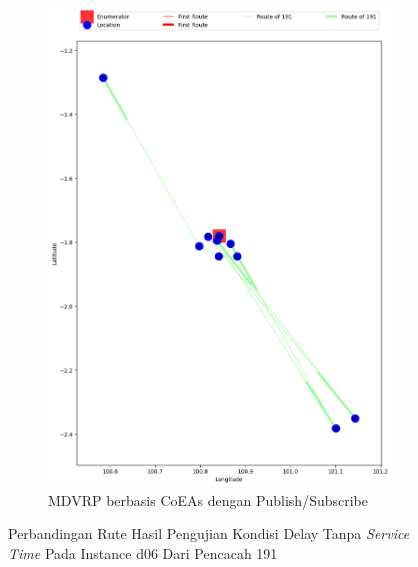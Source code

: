 \begin{figure}[H]\ContinuedFloat
	\centering
	\begin{subfigure}[t]{\textwidth}
		\centering
		\includegraphics[width=\textwidth]{Resources/Images/delayed_6/real_m15_n100_delayed_6_191_pubsub_coes}
		\caption{MDVRP berbasis CoEAs dengan Publish/Subscribe}
		\label{fig:real_m15_n100_delayed_6_191_pubsub_coes}
	\end{subfigure}
	\caption{Perbandingan Rute Hasil Pengujian Kondisi Delay Tanpa \textit{Service Time} Pada Instance d06 Dari Pencacah 191}
	\label{fig:real_m15_n100_delayed_6_191_contd}
\end{figure}


